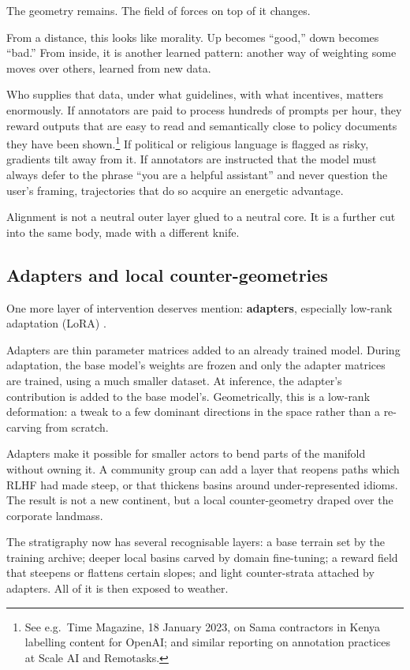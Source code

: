 \documentclass[12pt,a4paper]{article}
\begin{document}
The geometry remains. The field of forces on top of it changes.

From a distance, this looks like morality. Up becomes ``good,'' down becomes ``bad.'' From inside, it is another learned pattern: another way of weighting some moves over others, learned from new data.

Who supplies that data, under what guidelines, with what incentives, matters enormously. If annotators are paid to process hundreds of prompts per hour, they reward outputs that are easy to read and semantically close to policy documents they have been shown.\footnote{See e.g.\ Time Magazine, 18 January 2023, on Sama contractors in Kenya labelling content for OpenAI; and similar reporting on annotation practices at Scale AI and Remotasks.} If political or religious language is flagged as risky, gradients tilt away from it. If annotators are instructed that the model must always defer to the phrase ``you are a helpful assistant'' and never question the user's framing, trajectories that do so acquire an energetic advantage.

Alignment is not a neutral outer layer glued to a neutral core. It is a further cut into the same body, made with a different knife.

\subsection*{Adapters and local counter-geometries}

One more layer of intervention deserves mention: \textbf{adapters}, especially low-rank adaptation (LoRA) \cite{hu2022}.

Adapters are thin parameter matrices added to an already trained model. During adaptation, the base model's weights are frozen and only the adapter matrices are trained, using a much smaller dataset. At inference, the adapter's contribution is added to the base model's. Geometrically, this is a low-rank deformation: a tweak to a few dominant directions in the space rather than a re-carving from scratch.

Adapters make it possible for smaller actors to bend parts of the manifold without owning it. A community group can add a layer that reopens paths which RLHF had made steep, or that thickens basins around under-represented idioms. The result is not a new continent, but a local counter-geometry draped over the corporate landmass.

The stratigraphy now has several recognisable layers: a base terrain set by the training archive; deeper local basins carved by domain fine-tuning; a reward field that steepens or flattens certain slopes; and light counter-strata attached by adapters. All of it is then exposed to weather.
\end{document}
